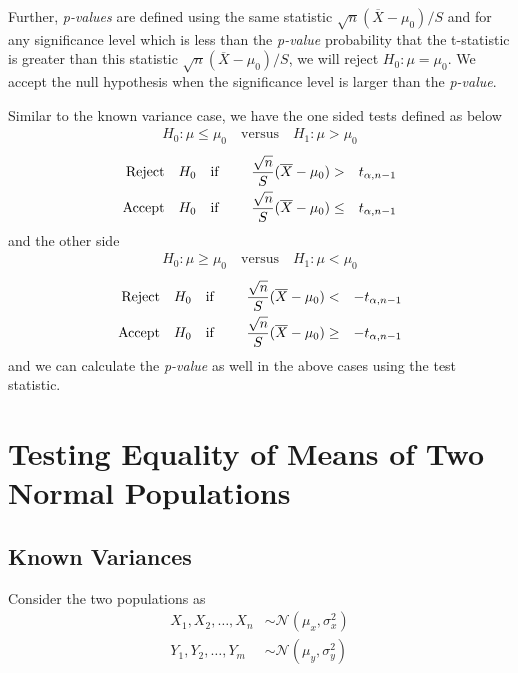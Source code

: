 \documentclass[../probability-notes.tex]{subfiles}
\begin{document}
    Further, \emph{p-values} are defined using the same statistic $\sqrt{n}(\overline{X} - \mu_{0})/S$ and for any significance level which is less than the \emph{p-value} probability that the t-statistic is greater than this statistic $\sqrt{n}(\overline{X} - \mu_{0})/S$, we will reject $H_{0}: \mu = \mu_{0}$. We accept the null hypothesis when the significance level is larger than the \emph{p-value}.\newline

    Similar to the known variance case, we have the one sided tests defined as below
    \begin{align*}
        H_{0}: \mu \leq \mu_{0} \quad \text{versus} \quad H_{1}: \mu > \mu_{0}
    \end{align*}
    \begin{alignat*}{4}
        \text{Reject\quad} &H_{0} \text{\quad if \quad} &\frac{\sqrt{n}}{S}(\overline{X} - \mu_{0}) &> &t_{\alpha, n-1}\\
        \text{Accept\quad} &H_{0} \text{\quad if\quad} &\frac{\sqrt{n}}{S}(\overline{X} - \mu_{0}) &\leq &t_{\alpha, n-1}\\
    \end{alignat*}
    and the other side
    \begin{align*}
        H_{0}: \mu \geq \mu_{0} \quad \text{versus} \quad H_{1}: \mu < \mu_{0}
    \end{align*}
    \begin{alignat*}{4}
        \text{Reject\quad} &H_{0} \text{\quad if \quad} &\frac{\sqrt{n}}{S}(\overline{X} - \mu_{0}) &< &-t_{\alpha, n-1}\\
        \text{Accept\quad} &H_{0} \text{\quad if\quad} &\frac{\sqrt{n}}{S}(\overline{X} - \mu_{0}) &\geq &-t_{\alpha, n-1}\\
    \end{alignat*}
    and we can calculate the \emph{p-value} as well in the above cases using the test statistic.\newline

    
    \section{Testing Equality of Means of Two Normal Populations}
    \subsection{Known Variances} \label{mean_diff_normal_known_variance}
    Consider the two populations as
    \begin{align*}
        X_{1}, X_{2}, \ldots, X_{n} &\sim \mathcal{N}(\mu_{x}, \sigma_{x}^{2})\\
        Y_{1}, Y_{2}, \ldots, Y_{m} &\sim \mathcal{N}(\mu_{y}, \sigma_{y}^{2})
    \end{align*}
\end{document}

